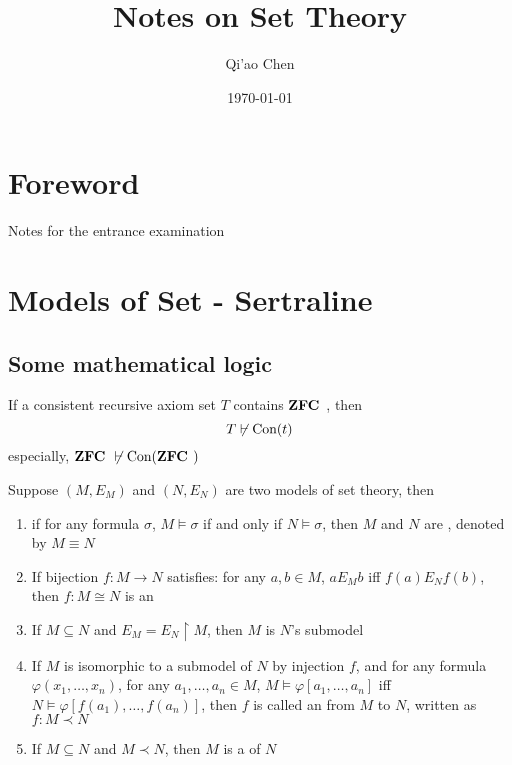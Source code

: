 \documentclass[11pt]{article}
\author{Qi'ao Chen}
\date{\today}
\title{Notes on Set Theory}
\begin{document}
\maketitle
\tableofcontents \clearpage
\section{Foreword}
\label{sec:org01ba3a1}
Notes for the entrance examination
\section{Models of Set - Sertraline}
\label{sec:orgc0ac8f5}
\subsection{Some mathematical logic}
\label{sec:orgf00f0b7}
\begin{theorem}
If a consistent recursive axiom set \(T\) contains \(\textbf{ZFC }\), then
\begin{equation*}
T\not\vdash\text{Con}(t)
\end{equation*}
especially, \(\textbf{ZFC }\not\vdash\text{Con}(\textbf{ZFC })\)
\end{theorem}

\begin{definition}[]
Suppose \((M,E_M)\) and \((N,E_N)\) are two models of set theory, then
\begin{enumerate}
\item if for any formula \(\sigma\), \(M\models\sigma\) if and only if
\(N\models\sigma\), then \(M\) and \(N\) are , denoted
by \(M\equiv N\)
\item If bijection \(f:M\to N\) satisfies: for any \(a,b\in M\), \(aE_Mb\) iff
\(f(a)E_Nf(b)\), then \(f:M\cong N\) is an 
\item If \(M\subseteq N\) and \(E_M=E_N\restriction M\), then \(M\) is \(N\)'s submodel
\item If \(M\) is isomorphic to a submodel of \(N\) by injection \(f\), and for any
formula \(\varphi(x_1,\dots,x_n)\), for any \(a_1,\dots,a_n\in M\), 
\(M\models\varphi[a_1,\dots,a_n]\) iff
\(N\models\varphi[f(a_1),\dots,f(a_n)]\), then \(f\) is called an
 from \(M\) to \(N\), written as \(f:M\prec N\)
\item If \(M\subseteq N\) and \(M\prec N\), then \(M\) is a 
of \(N\)
\end{enumerate}
\end{definition}
\end{document}
